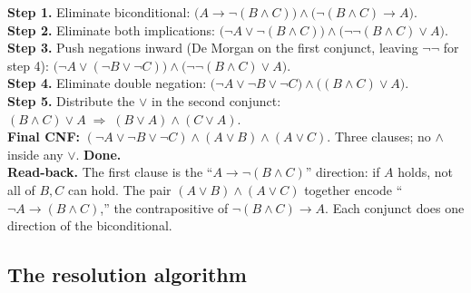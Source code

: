 \documentclass[11pt, a4paper]{article}
\begin{document}
\begin{exbox}
\textbf{Step 1.} Eliminate biconditional: $\bigl(A \rightarrow \neg(B \land C)\bigr) \land \bigl(\neg(B \land C) \rightarrow A\bigr)$.\\[0.3em]
\textbf{Step 2.} Eliminate both implications: $\bigl(\neg A \lor \neg(B \land C)\bigr) \land \bigl(\neg\neg(B \land C) \lor A\bigr)$.\\[0.3em]
\textbf{Step 3.} Push negations inward (De Morgan on the first conjunct, leaving $\neg\neg$ for step 4): $\bigl(\neg A \lor (\neg B \lor \neg C)\bigr) \land \bigl(\neg\neg(B \land C) \lor A\bigr)$.\\[0.3em]
\textbf{Step 4.} Eliminate double negation: $\bigl(\neg A \lor \neg B \lor \neg C\bigr) \land \bigl((B \land C) \lor A\bigr)$.\\[0.3em]
\textbf{Step 5.} Distribute the $\lor$ in the second conjunct: $(B \land C) \lor A \;\Rightarrow\; (B \lor A) \land (C \lor A)$.\\[0.3em]
\textbf{Final CNF:} $(\neg A \lor \neg B \lor \neg C) \land (A \lor B) \land (A \lor C)$. Three clauses; no $\land$ inside any $\lor$. \textbf{Done.}\\[0.3em]
\textbf{Read-back.} The first clause is the ``$A \rightarrow \neg(B \land C)$'' direction: if $A$ holds, not all of $B, C$ can hold. The pair $(A \lor B) \land (A \lor C)$ together encode ``$\neg A \rightarrow (B \land C)$,'' the contrapositive of $\neg(B \land C) \rightarrow A$. Each conjunct does one direction of the biconditional.
\end{exbox}

\subsection{The resolution algorithm}
\end{document}
